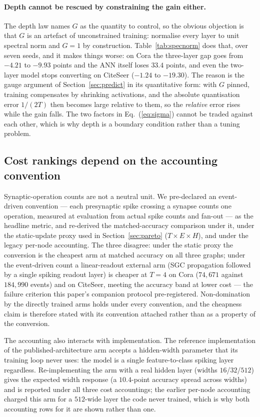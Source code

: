 \documentclass[10pt,twocolumn]{article}
\newcommand{\tabref}[1]{Table~\ref{#1}}
\newcommand{\secref}[1]{Section~\ref{#1}}
\newcommand{\eqnref}[1]{Eq.~(\ref{#1})}
\begin{document}
\paragraph{Depth cannot be rescued by constraining the gain either.} The depth law names $G$ as the
quantity to control, so the obvious objection is that $G$ is an artefact of unconstrained training:
normalise every layer to unit spectral norm and $G=1$ by construction. \tabref{tab:specnorm} does
that, over seven seeds, and it makes things worse: on Cora the three-layer gap goes from $-4.21$ to
$-9.93$ points and the ANN itself loses $33.4$ points, and even the two-layer model stops converting
on CiteSeer ($-1.24$ to $-19.30$). The reason is the gauge argument of \secref{sec:predict} in its
quantitative form: with $G$ pinned, training compensates by shrinking activations, and the absolute
quantisation error $1/(2T)$ then becomes large relative to them, so the \emph{relative} error rises
while the gain falls. The two factors in \eqnref{eq:sigma} cannot be traded against each other, which
is why depth is a boundary condition rather than a tuning problem.



\subsection{Cost rankings depend on the accounting convention}
\label{sec:accounting}

Synaptic-operation counts are not a neutral unit. We pre-declared an event-driven convention ---
each presynaptic spike crossing a synapse counts one operation, measured at evaluation from
actual spike counts and fan-out --- as the headline metric, and re-derived the matched-accuracy
comparison under it, under the static-update proxy used in \secref{sec:pareto}
($T \times E \times H$), and under the legacy per-node accounting. The three disagree: under the
static proxy the conversion is the cheapest arm at matched accuracy on all three graphs; under the
event-driven count a linear-readout external arm (SGC propagation followed by a single spiking
readout layer) is cheaper at $T=4$ on Cora ($74{,}671$ against $184{,}990$ events) and on CiteSeer,
meeting the accuracy band at lower cost --- the failure criterion this paper's companion protocol
pre-registered. Non-domination by the directly trained arms holds under every convention, and the
cheapness claim is therefore stated with its convention attached rather than as a property of the
conversion.

The accounting also interacts with implementation. The reference implementation of the
published-architecture arm accepts a hidden-width parameter that its training loop never uses: the
model is a single feature-to-class spiking layer regardless. Re-implementing the arm with a real
hidden layer (widths $16$/$32$/$512$) gives the expected width response (a $10.4$-point accuracy
spread across widths) and is reported under all three cost accountings; the earlier per-node
accounting charged this arm for a $512$-wide layer the code never trained, which is why both
accounting rows for it are shown rather than one.
\end{document}
